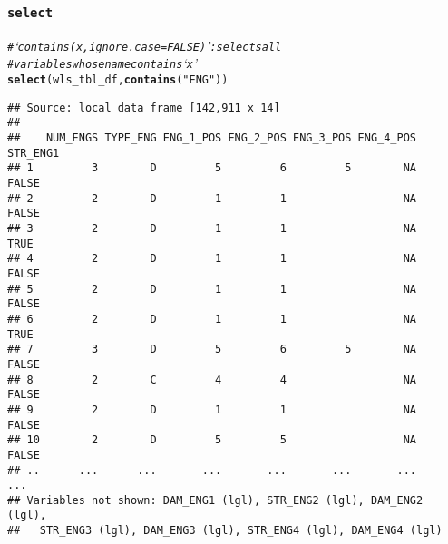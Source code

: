\documentclass{beamer}\usepackage[]{graphicx}\usepackage[]{color}
\makeatletter
\newcommand{\hlstr}[1]{\textcolor[rgb]{0.192,0.494,0.8}{#1}}%
\newcommand{\hlcom}[1]{\textcolor[rgb]{0.678,0.584,0.686}{\textit{#1}}}%
\newcommand{\hlstd}[1]{\textcolor[rgb]{0.345,0.345,0.345}{#1}}%
\newcommand{\hlkwd}[1]{\textcolor[rgb]{0.737,0.353,0.396}{\textbf{#1}}}%
\newenvironment{kframe}{%
 \def\at@end@of@kframe{}%
 \ifinner\ifhmode%
  \def\at@end@of@kframe{\end{minipage}}%
  \begin{minipage}{\columnwidth}%
 \fi\fi%
 \def\FrameCommand##1{\hskip\@totalleftmargin \hskip-\fboxsep
 \colorbox{shadecolor}{##1}\hskip-\fboxsep
     \hskip-\linewidth \hskip-\@totalleftmargin \hskip\columnwidth}%
 \MakeFramed {\advance\hsize-\width
   \@totalleftmargin\z@ \linewidth\hsize
   \@setminipage}}%
 {\par\unskip\endMakeFramed%
 \at@end@of@kframe}
\newenvironment{knitrout}{}{} %
\makeatother
\begin{document}
\begin{frame}[fragile]
  \frametitle{{\tt select}}
\begin{knitrout}\footnotesize
{}\color{fgcolor}\begin{kframe}
\begin{alltt}
\hlcom{# ‘contains(x, ignore.case = FALSE)’: selects all}
\hlcom{# variables whose name  contains ‘x’}
\hlkwd{select}\hlstd{(wls_tbl_df,} \hlkwd{contains}\hlstd{(}\hlstr{"ENG"}\hlstd{))}
\end{alltt}
\begin{verbatim}
## Source: local data frame [142,911 x 14]
## 
##    NUM_ENGS TYPE_ENG ENG_1_POS ENG_2_POS ENG_3_POS ENG_4_POS STR_ENG1
## 1         3        D         5         6         5        NA    FALSE
## 2         2        D         1         1                  NA    FALSE
## 3         2        D         1         1                  NA     TRUE
## 4         2        D         1         1                  NA    FALSE
## 5         2        D         1         1                  NA    FALSE
## 6         2        D         1         1                  NA     TRUE
## 7         3        D         5         6         5        NA    FALSE
## 8         2        C         4         4                  NA    FALSE
## 9         2        D         1         1                  NA    FALSE
## 10        2        D         5         5                  NA    FALSE
## ..      ...      ...       ...       ...       ...       ...      ...
## Variables not shown: DAM_ENG1 (lgl), STR_ENG2 (lgl), DAM_ENG2 (lgl),
##   STR_ENG3 (lgl), DAM_ENG3 (lgl), STR_ENG4 (lgl), DAM_ENG4 (lgl)
\end{verbatim}
\end{kframe}
\end{knitrout}
\end{frame} 
\end{document}
